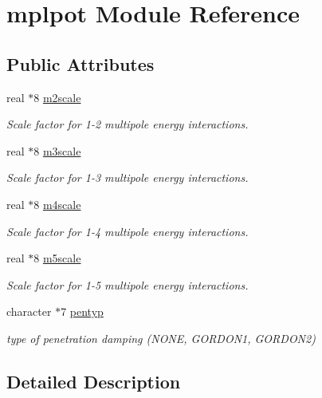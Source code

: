 \hypertarget{classmplpot}{\section{mplpot Module Reference}
\label{classmplpot}
}
\subsection*{Public Attributes}
\begin{DoxyCompactItemize}
\item 
real $\ast$8 \hyperlink{classmplpot_a041f4f65d92047cafeb5342c4ec33f7d}{m2scale}
\begin{DoxyCompactList}\small\item\em Scale factor for 1-\/2 multipole energy interactions. \end{DoxyCompactList}\item 
real $\ast$8 \hyperlink{classmplpot_abb0c7e641014206b5361845ffdc10eae}{m3scale}
\begin{DoxyCompactList}\small\item\em Scale factor for 1-\/3 multipole energy interactions. \end{DoxyCompactList}\item 
real $\ast$8 \hyperlink{classmplpot_ac98710d40643d7a17351a54a7eb339a6}{m4scale}
\begin{DoxyCompactList}\small\item\em Scale factor for 1-\/4 multipole energy interactions. \end{DoxyCompactList}\item 
real $\ast$8 \hyperlink{classmplpot_a4220981e046106273c4f663d172b6a64}{m5scale}
\begin{DoxyCompactList}\small\item\em Scale factor for 1-\/5 multipole energy interactions. \end{DoxyCompactList}\item 
character $\ast$7 \hyperlink{classmplpot_a708bce94d76aeb8f27fb117d8b2af74d}{pentyp}
\begin{DoxyCompactList}\small\item\em type of penetration damping (N\-O\-N\-E, G\-O\-R\-D\-O\-N1, G\-O\-R\-D\-O\-N2) \end{DoxyCompactList}\end{DoxyCompactItemize}


\subsection{Detailed Description}


